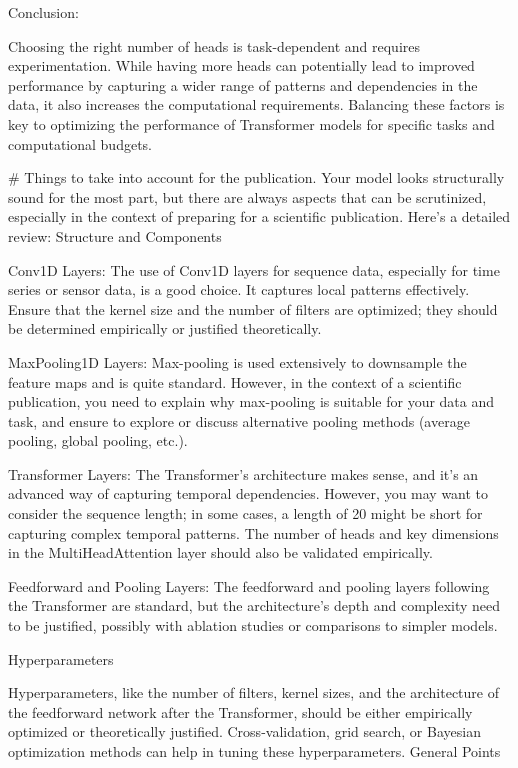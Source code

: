 Conclusion:

Choosing the right number of heads is task-dependent and requires experimentation. While having more heads can potentially lead to improved performance by capturing a wider range of patterns and dependencies in the data, it also increases the computational requirements. Balancing these factors is key to optimizing the performance of Transformer models for specific tasks and computational budgets.






# Things to take into account for the publication. 
Your model looks structurally sound for the most part, but there are always aspects that can be scrutinized, especially in the context of preparing for a scientific publication. Here's a detailed review:
Structure and Components

    Conv1D Layers:
        The use of Conv1D layers for sequence data, especially for time series or sensor data, is a good choice. It captures local patterns effectively. Ensure that the kernel size and the number of filters are optimized; they should be determined empirically or justified theoretically.

    MaxPooling1D Layers:
        Max-pooling is used extensively to downsample the feature maps and is quite standard. However, in the context of a scientific publication, you need to explain why max-pooling is suitable for your data and task, and ensure to explore or discuss alternative pooling methods (average pooling, global pooling, etc.).

    Transformer Layers:
        The Transformer’s architecture makes sense, and it's an advanced way of capturing temporal dependencies. However, you may want to consider the sequence length; in some cases, a length of 20 might be short for capturing complex temporal patterns. The number of heads and key dimensions in the MultiHeadAttention layer should also be validated empirically.

    Feedforward and Pooling Layers:
        The feedforward and pooling layers following the Transformer are standard, but the architecture’s depth and complexity need to be justified, possibly with ablation studies or comparisons to simpler models.

Hyperparameters

Hyperparameters, like the number of filters, kernel sizes, and the architecture of the feedforward network after the Transformer, should be either empirically optimized or theoretically justified. Cross-validation, grid search, or Bayesian optimization methods can help in tuning these hyperparameters.
General Points

